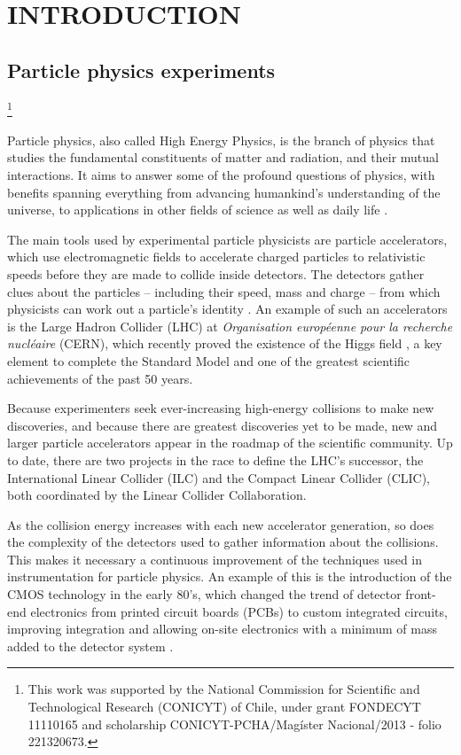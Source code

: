 \newcommand\blfootnote[1]{%
  \begingroup
  \renewcommand\thefootnote{}\footnote{#1}%
  \addtocounter{footnote}{-1}%
  \endgroup
}

\chapter{INTRODUCTION}
\label{chapter:introduction}
\section{Particle physics experiments}
\blfootnote{This work was supported by the National Commission for Scientific and Technological Research (CONICYT) of Chile, under grant FONDECYT 11110165 and scholarship CONICYT-PCHA/Mag\'ister Nacional/2013 - folio 221320673.} Particle physics, also called High Energy Physics, is the branch of physics that studies the fundamental constituents of matter and radiation, and their mutual interactions. It aims to answer some of the profound questions of physics, with benefits spanning everything from advancing humankind’s understanding of the universe, to applications in other fields of science as well as daily life \citep{tuttle101}.

The main tools used by experimental particle physicists are particle accelerators, which use electromagnetic fields to accelerate charged particles to relativistic speeds before they are made to collide inside detectors. The detectors gather clues about the particles – including their speed, mass and charge – from which physicists can work out a particle's identity \citep{cern101}. An example of such an accelerators is the Large Hadron Collider (LHC) at \emph{Organisation européenne pour la recherche nucléaire} (CERN), which recently proved the existence of the Higgs field \citep{Aad:2012tfa, Chatrchyan:2012ufa}, a key element to complete the Standard Model and one of the greatest scientific achievements of the past 50 years. 

Because experimenters seek ever-increasing high-energy collisions to make new discoveries, and because there are greatest discoveries yet to be made, new and larger particle accelerators appear in the roadmap of the scientific community. Up to date, there are two projects in the race to define the LHC's successor, the International Linear Collider (ILC) and the Compact Linear Collider (CLIC), both coordinated by the Linear Collider Collaboration. 

As the collision energy increases with each new accelerator generation, so does the complexity of the detectors used to gather information about the collisions. This makes it necessary a continuous improvement of the techniques used in instrumentation for particle physics. An example of this is the introduction of the CMOS technology in the early 80's, which changed the trend of detector front-end electronics from printed circuit boards (PCBs) to custom integrated circuits, improving integration and allowing on-site electronics with a minimum of mass added to the detector system \citep{abuslemethesis}. 


